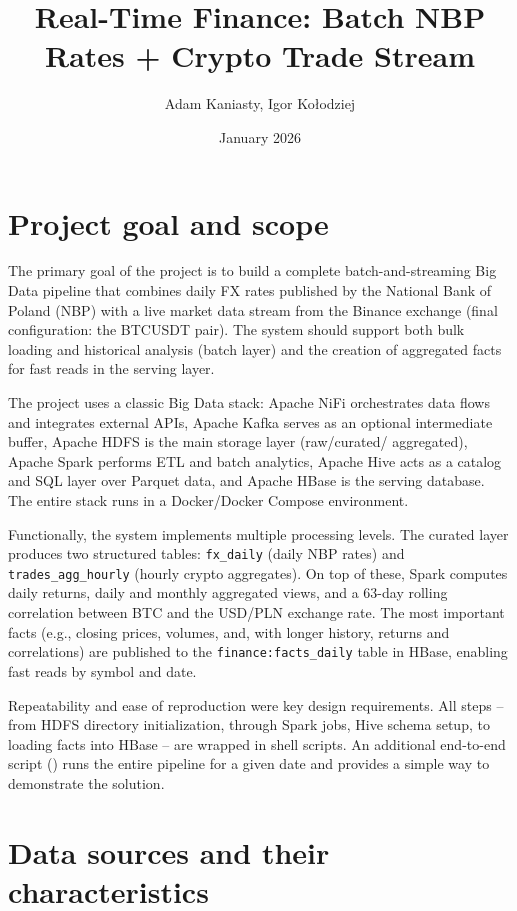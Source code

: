 \documentclass{article}
\title{Real-Time Finance: Batch NBP Rates + Crypto Trade Stream}
\author{Adam Kaniasty, Igor Ko{\l}odziej}
\date{January 2026}
\begin{document}
\maketitle
\clearpage

{
\setcounter{tocdepth}{3}
\tableofcontents
}
\clearpage
\section{Project goal and scope}

The primary goal of the project is to build a complete batch-and-streaming
Big Data pipeline that combines daily FX rates published by the National
Bank of Poland (NBP) with a live market data stream from the Binance
exchange (final configuration: the BTCUSDT pair). The system should
support both bulk loading and historical analysis (batch layer) and the
creation of aggregated facts for fast reads in the serving layer.

The project uses a classic Big Data stack: Apache NiFi orchestrates data
flows and integrates external APIs, Apache Kafka serves as an optional
intermediate buffer, Apache HDFS is the main storage layer (raw/curated/
aggregated), Apache Spark performs ETL and batch analytics, Apache Hive
acts as a catalog and SQL layer over Parquet data, and Apache HBase is the
serving database. The entire stack runs in a Docker/Docker Compose
environment.

Functionally, the system implements multiple processing levels. The
curated layer produces two structured tables: \texttt{fx\_daily} (daily
NBP rates) and \texttt{trades\_agg\_hourly} (hourly crypto aggregates).
On top of these, Spark computes daily returns, daily and monthly
aggregated views, and a 63-day rolling correlation between BTC and the
USD/PLN exchange rate. The most important facts (e.g., closing prices,
volumes, and, with longer history, returns and correlations) are
published to the \texttt{finance:facts\_daily} table in HBase, enabling
fast reads by symbol and date.

Repeatability and ease of reproduction were key design requirements. All
steps -- from HDFS directory initialization, through Spark jobs, Hive
schema setup, to loading facts into HBase -- are wrapped in shell
scripts. An additional end-to-end script
() runs the entire pipeline for
a given date and provides a simple way to demonstrate the solution.

\section{Data sources and their characteristics}
\end{document}
